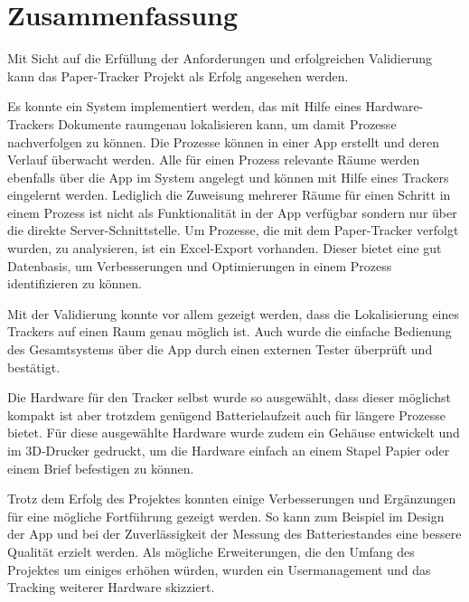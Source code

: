\chapter{Zusammenfassung}

Mit Sicht auf die Erfüllung der Anforderungen und erfolgreichen Validierung kann das Paper-Tracker Projekt als
Erfolg angesehen werden.

Es konnte ein System implementiert werden, das mit Hilfe eines Hardware-Trackers Dokumente
raumgenau lokalisieren kann, um damit Prozesse nachverfolgen zu können.
Die Prozesse können in einer App erstellt und deren Verlauf überwacht werden.
Alle für einen Prozess relevante Räume werden ebenfalls über die App im System angelegt und können mit Hilfe eines
Trackers eingelernt werden.
Lediglich die Zuweisung mehrerer Räume für einen Schritt in einem Prozess ist nicht als Funktionalität in der App
verfügbar sondern nur über die direkte Server-Schnittstelle.
Um Prozesse, die mit dem Paper-Tracker verfolgt wurden, zu analysieren, ist ein Excel-Export vorhanden.
Dieser bietet eine gut Datenbasis, um Verbesserungen und Optimierungen in einem Prozess identifizieren zu können.

Mit der Validierung konnte vor allem gezeigt werden, dass die Lokalisierung eines Trackers auf einen Raum genau möglich ist.
Auch wurde die einfache Bedienung des Gesamtsystems über die App durch einen externen Tester überprüft und bestätigt.

Die Hardware für den Tracker selbst wurde so ausgewählt, dass dieser möglichst kompakt ist aber trotzdem genügend
Batterielaufzeit auch für längere Prozesse bietet.
Für diese ausgewählte Hardware wurde zudem ein Gehäuse entwickelt und im 3D-Drucker gedruckt, um die Hardware
einfach an einem Stapel Papier oder einem Brief befestigen zu können.

Trotz dem Erfolg des Projektes konnten einige Verbesserungen und Ergänzungen für eine mögliche Fortführung gezeigt werden.
So kann zum Beispiel im Design der App und bei der Zuverlässigkeit der Messung des Batteriestandes eine bessere Qualität erzielt werden.
Als mögliche Erweiterungen, die den Umfang des Projektes um einiges erhöhen würden, wurden ein Usermanagement und das Tracking weiterer Hardware skizziert.
